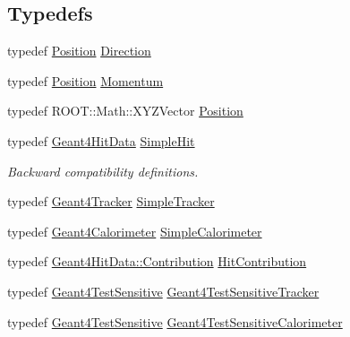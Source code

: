 \subsection*{Typedefs}
\begin{DoxyCompactItemize}
\item 
typedef \hyperlink{namespace_d_d4hep_1_1_simulation_ad6fd94b3439e31d1ba4b2e640d578558}{Position} \hyperlink{namespace_d_d4hep_1_1_simulation_a4b5bfd838293f3222b9d004c7dd1d6b3}{Direction}
\item 
typedef \hyperlink{namespace_d_d4hep_1_1_simulation_ad6fd94b3439e31d1ba4b2e640d578558}{Position} \hyperlink{namespace_d_d4hep_1_1_simulation_aead01eb580dc503a5abba194d179c963}{Momentum}
\item 
typedef ROOT::Math::XYZVector \hyperlink{namespace_d_d4hep_1_1_simulation_ad6fd94b3439e31d1ba4b2e640d578558}{Position}
\item 
typedef \hyperlink{class_d_d4hep_1_1_simulation_1_1_geant4_hit_data}{Geant4HitData} \hyperlink{namespace_d_d4hep_1_1_simulation_a0a561b07f32c81b4365bdc61e74e645b}{SimpleHit}
\begin{DoxyCompactList}\small\item\em Backward compatibility definitions. \item\end{DoxyCompactList}\item 
typedef \hyperlink{class_d_d4hep_1_1_simulation_1_1_geant4_tracker}{Geant4Tracker} \hyperlink{namespace_d_d4hep_1_1_simulation_aeac70046c56d692918ebee2e3cdd8c3f}{SimpleTracker}
\item 
typedef \hyperlink{class_d_d4hep_1_1_simulation_1_1_geant4_calorimeter}{Geant4Calorimeter} \hyperlink{namespace_d_d4hep_1_1_simulation_a05940f87d83b165713f6c92d7cd9425f}{SimpleCalorimeter}
\item 
typedef \hyperlink{class_d_d4hep_1_1_simulation_1_1_geant4_hit_data_1_1_monte_carlo_contrib}{Geant4HitData::Contribution} \hyperlink{namespace_d_d4hep_1_1_simulation_af3e4b03fc6b6e8a0ed0cba9dbf6c1f69}{HitContribution}
\item 
typedef \hyperlink{class_d_d4hep_1_1_simulation_1_1_test_1_1_geant4_test_sensitive}{Geant4TestSensitive} \hyperlink{namespace_d_d4hep_1_1_simulation_a6a20cbc2140f1f0da9332fe90fb80600}{Geant4TestSensitiveTracker}
\item 
typedef \hyperlink{class_d_d4hep_1_1_simulation_1_1_test_1_1_geant4_test_sensitive}{Geant4TestSensitive} \hyperlink{namespace_d_d4hep_1_1_simulation_a67912331acd262c46253c23cbc346cf5}{Geant4TestSensitiveCalorimeter}

\end{DoxyCompactItemize}
